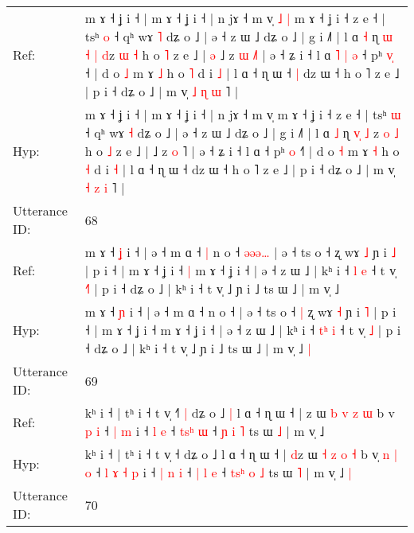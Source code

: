 \documentclass[10pt]{article}
\DeclareRobustCommand{\hl}[1]{{\textcolor{red}{#1}}}
\begin{document}
\begin{longtable}{ll}
Ref: & m ɤ ˧ ʝ i ˧ | m ɤ ˧ ʝ i ˧ | n jɤ ˧ m v̩\hl{ }\hl{˩}\hl{ }\hl{|} m ɤ ˧ ʝ i ˧ z e ˧ | tsʰ \hl{o} ˧ qʰ wɤ \hl{˥} dʑ o ˩ | ə ˧ z ɯ ˩ dʑ o ˩ | g i ˩˥ | l ɑ \hl{˧} ɳ \hl{ɯ}\hl{ }\hl{˧} \hl{|} \hl{d}z \hl{ɯ} \hl{˧} h o \hl{˥} z e ˩ |\hl{ }\hl{ə} ˩ z \hl{ɯ} \hl{˩}˥ | ə ˧ ʑ i ˧ l ɑ\hl{ }\hl{˥}\hl{ }\hl{|}\hl{ }\hl{ə} ˧ pʰ \hl{v}\hl{̩} ˧\hl{} | d o \hl{˩} m ɤ \hl{˩} h o \hl{˥} d i \hl{˩} | l ɑ ˧ ɳ ɯ ˧\hl{ }\hl{|} dz ɯ ˧ h o ˥ z e ˩ | p i ˧ dʑ o ˩ | m v̩ \hl{˩} \hl{ɳ} \hl{ɯ} ˥ |
 \\
Hyp: & m ɤ ˧ ʝ i ˧ | m ɤ ˧ ʝ i ˧ | n jɤ ˧ m v̩\hl{}\hl{}\hl{}\hl{} m ɤ ˧ ʝ i ˧ z e ˧ | tsʰ \hl{ɯ} ˧ qʰ wɤ \hl{˧} dʑ o ˩ | ə ˧ z ɯ ˩ dʑ o ˩ | g i ˩˥ | l ɑ \hl{˩} ɳ \hl{}\hl{v}\hl{̩} \hl{˩} \hl{}z \hl{o} \hl{˩} h o \hl{˩} z e ˩ |\hl{}\hl{} ˩ z \hl{o} \hl{}˥ | ə ˧ ʑ i ˧ l ɑ\hl{}\hl{}\hl{}\hl{}\hl{}\hl{} ˧ pʰ \hl{}\hl{o} ˧\hl{˥} | d o \hl{˧} m ɤ \hl{˧} h o \hl{˧} d i \hl{˧} | l ɑ ˧ ɳ ɯ ˧\hl{}\hl{} dz ɯ ˧ h o ˥ z e ˩ | p i ˧ dʑ o ˩ | m v̩ \hl{˧} \hl{z} \hl{i} ˥ |
 \\
\midrule
Utterance ID: & 68 \\
Ref: & m ɤ ˧ \hl{ʝ} i ˧ | ə ˧ m ɑ ˧\hl{ }\hl{|} n o ˧\hl{ }\hl{ə}\hl{ə}\hl{ə}\hl{…} | ə ˧ ts o ˧\hl{}\hl{} ʐ wɤ \hl{˩} ɲ i \hl{˩} | p i ˧ | m ɤ ˧ ʝ i ˧\hl{ }\hl{|} m ɤ ˧ ʝ i ˧ | ə ˧ z ɯ ˩ | kʰ i ˧ \hl{}\hl{l} \hl{e} ˧ t v̩ \hl{˧}\hl{˥} | p i ˧ dʑ o ˩ | kʰ i ˧ t v̩ ˩ ɲ i ˩ ts ɯ ˩ | m v̩ ˩\hl{}\hl{}
 \\
Hyp: & m ɤ ˧ \hl{ɲ} i ˧ | ə ˧ m ɑ ˧\hl{}\hl{} n o ˧\hl{}\hl{}\hl{}\hl{}\hl{} | ə ˧ ts o ˧\hl{ }\hl{|} ʐ wɤ \hl{˧} ɲ i \hl{˥} | p i ˧ | m ɤ ˧ ʝ i ˧\hl{}\hl{} m ɤ ˧ ʝ i ˧ | ə ˧ z ɯ ˩ | kʰ i ˧ \hl{t}\hl{ʰ} \hl{i} ˧ t v̩ \hl{}\hl{˩} | p i ˧ dʑ o ˩ | kʰ i ˧ t v̩ ˩ ɲ i ˩ ts ɯ ˩ | m v̩ ˩\hl{ }\hl{|}
 \\
\midrule
Utterance ID: & 69 \\
Ref: & kʰ i ˧ | tʰ i ˧ t v̩ ˧\hl{˥}\hl{ }\hl{|} dʑ o ˩\hl{ }\hl{|} l ɑ ˧ ɳ ɯ ˧ | \hl{}z ɯ \hl{b} \hl{v} \hl{z} \hl{ɯ} b v\hl{}\hl{}\hl{} \hl{p} \hl{i} ˧\hl{}\hl{}\hl{}\hl{} \hl{|} \hl{m} i ˧\hl{}\hl{} \hl{l} \hl{e} ˧ \hl{t}\hl{s}\hl{ʰ} \hl{ɯ} ˧ \hl{}\hl{}\hl{ɲ} \hl{i} \hl{˥} ts ɯ \hl{˩} | m v̩ ˩\hl{}\hl{}
 \\
Hyp: & kʰ i ˧ | tʰ i ˧ t v̩ ˧\hl{}\hl{}\hl{} dʑ o ˩\hl{}\hl{} l ɑ ˧ ɳ ɯ ˧ | \hl{d}z ɯ \hl{˧} \hl{z} \hl{o} \hl{˧} b v\hl{̩}\hl{ }\hl{n} \hl{|} \hl{o} ˧\hl{ }\hl{l}\hl{ }\hl{ɤ} \hl{˧} \hl{p} i ˧\hl{ }\hl{|} \hl{n} \hl{i} ˧ \hl{|}\hl{ }\hl{l} \hl{e} ˧ \hl{t}\hl{s}\hl{ʰ} \hl{o} \hl{˩} ts ɯ \hl{˥} | m v̩ ˩\hl{ }\hl{|}
 \\
\midrule
Utterance ID: & 70 \\

\end{longtable}
\end{document}
